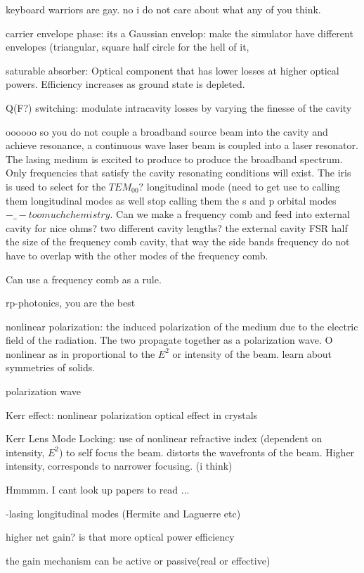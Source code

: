 \documentclass[11pt,a4paper]{book}
\begin{document}
keyboard warriors are gay. no i do not care about what any of you think.

carrier envelope phase: its a Gaussian envelop: make the simulator have different envelopes (triangular, square half circle for the hell of it,

saturable absorber: Optical component that has lower losses at higher optical powers. Efficiency increases as ground state is depleted.

Q(F?) switching: modulate intracavity losses by varying the finesse of the cavity

oooooo so you do not couple a broadband source beam into the cavity and achieve resonance, a continuous wave laser beam is coupled into a laser resonator. The lasing medium is excited to produce to produce the broadband spectrum. Only frequencies that satisfy the cavity resonating conditions will exist. The iris is used to select for the $TEM_{00}?$ longitudinal mode (need to get use to calling them longitudinal modes as well stop calling them the s and p orbital modes $-\_- too much chemistry$. Can we make a frequency comb and feed into external cavity for nice ohms? two different cavity lengths? the external cavity FSR half the size of the frequency comb cavity, that way the side bands frequency do not have to overlap with the other modes of the frequency comb. 

Can use a frequency comb as a rule.

rp-photonics, you are the best

nonlinear polarization: the induced polarization of the medium due to the electric field of the radiation. The two propagate together as a polarization wave. O nonlinear as in proportional to the $E^2$ or intensity of the beam. learn about symmetries of solids.

polarization wave

Kerr effect: nonlinear polarization optical effect in crystals 

Kerr Lens Mode Locking: use of nonlinear refractive index (dependent on intensity, $E^2$) to self focus the beam. distorts the wavefronts of the beam. Higher intensity, corresponds to narrower focusing. (i think)

Hmmmm. I cant look up papers to read ...

-lasing longitudinal modes (Hermite and Laguerre etc)

higher net gain? is that more optical power efficiency

the gain mechanism can be active or passive(real or effective)
\end{document}
